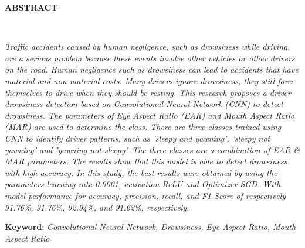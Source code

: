 \clearpage

\begin{minipage}{\textwidth}

\centering
\end{minipage}

\vspace{1em}

\normalsize \bfseries \centering \MakeUppercase{Abstract}
% 
\\[2\baselineskip]

\justifying \normalfont \normalsize

{

\textit{Traffic accidents caused by human negligence, such as drowsiness while driving, are a serious problem because these events involve other vehicles or other drivers on the road. Human negligence such as drowsiness can lead to accidents that have material and non-material costs. Many drivers ignore drowsiness, they still force themselves to drive when they should be resting. This research proposes a driver drowsiness detection based on Convolutional Neural Network (CNN) to detect drowsiness. The parameters of Eye Aspect Ratio (EAR) and Mouth Aspect Ratio (MAR) are used to determine the class. There are three classes trained using CNN to identify driver patterns, such as 'sleepy and yawning', 'sleepy not yawning' and 'yawning not sleepy'. The three classes 
are a combination of EAR \& MAR parameters. The results show that this model is able to detect drowsiness with high accuracy. In this study, the best results were obtained by using the parameters \textit{learning rate} 0.0001, \textit{activation} ReLU and \textit{Optimizer} SGD. With model performance for accuracy, precision, recall, and F1-Score of respectively 91.76\%, 91.76\%, 92.94\%, and 91.62\%, respectively.
}

}

\textbf{Keyword}: \textit{Convolutional Neural Network, Drowsiness, Eye Aspect Ratio, Mouth
Aspect Ratio}

\clearpage